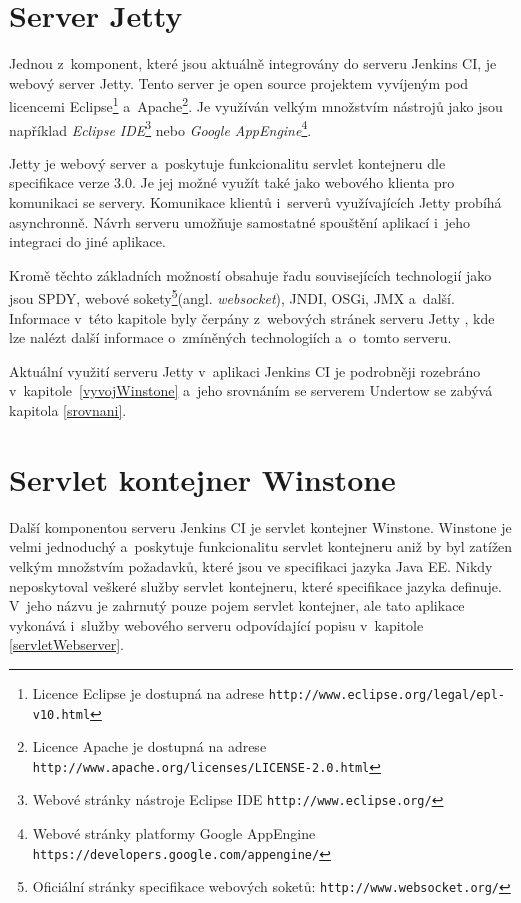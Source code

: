     \section{Server Jetty} \label{jetty}
        Jednou z~komponent, které jsou aktuálně integrovány do serveru Jenkins CI, je webový server Jetty.
        Tento server je open source projektem vyvíjeným pod licencemi 
        Eclipse\footnote{Licence Eclipse je dostupná na adrese \texttt{http://www.eclipse.org/legal/epl-v10.html}}
    a~Apache\footnote{Licence Apache je dostupná 
        na adrese \texttt{http://www.apache.org/licenses/LICENSE-2.0.html}}. 
            Je využíván velkým množstvím nástrojů jako jsou například \emph{Eclipse IDE}\footnote{Webové stránky nástroje Eclipse IDE 
        \texttt{http://www.eclipse.org/}} nebo \emph{Google AppEngine}\footnote{Webové stránky platformy Google AppEngine
        \texttt{https://developers.google.com/appengine/}}.

        Jetty je webový server a~poskytuje funkcionalitu servlet kontejneru dle specifikace verze 3.0. 
        Je jej možné využít také jako webového klienta pro komunikaci se servery. Komunikace
        klientů i~serverů využívajících Jetty probíhá asynchronně. 
        Návrh serveru umožňuje samostatné spouštění aplikací i~jeho integraci do jiné aplikace. 

        Kromě těchto základních možností obsahuje
        řadu souvisejících technologií jako jsou SPDY, webové sokety\footnote{Oficiální stránky 
            specifikace webových soketů: \texttt{http://www.websocket.org/}}(angl. \emph{websocket}),
        JNDI, OSGi, JMX a~další. 
        Informace v~této kapitole byly čerpány z~webových stránek serveru Jetty \cite{jettyWeb}, kde lze nalézt 
        další informace o~zmíněných technologiích a~o~tomto serveru.
        
        Aktuální využití serveru Jetty v~aplikaci Jenkins CI je podrobněji rozebráno
        v~kapitole~\ref{vyvojWinstone} a~jeho srovnáním se serverem Undertow se 
        zabývá kapitola \ref{srovnani}.
        

    \section{Servlet kontejner Winstone} \label{winstone}
        Další komponentou serveru Jenkins CI je servlet kontejner Winstone.
        Winstone je velmi jednoduchý a~poskytuje funkcionalitu
        servlet kontejneru aniž by byl zatížen velkým množstvím požadavků, které jsou ve specifikaci jazyka Java EE.
        Nikdy neposkytoval veškeré služby servlet kontejneru, které specifikace jazyka definuje. 
        V~jeho názvu je zahrnutý pouze pojem servlet kontejner, ale tato aplikace vykonává i~služby
        webového serveru odpovídající popisu v~kapitole \ref{servletWebserver}.

